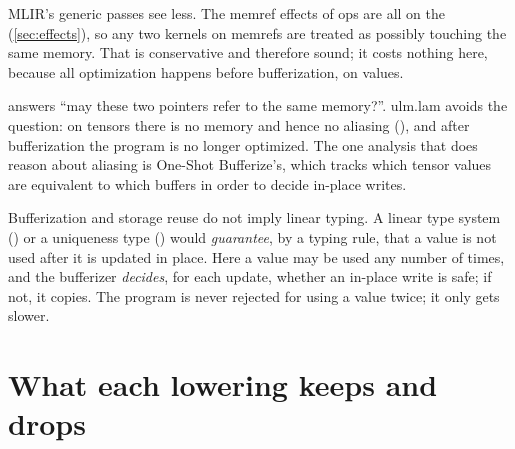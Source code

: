 MLIR's generic passes see less. The memref effects of  ops
are all on the  (\cref{sec:effects}), so any two
kernels on memrefs are treated as possibly touching the same memory. That
is conservative and therefore sound; it costs nothing here, because all
optimization happens before bufferization, on values.

\begin{theory}
answers ``may these two pointers refer to the same memory?''. ulm.lam
avoids the question: on tensors there is no memory and hence no aliasing
(), and after bufferization the program is no longer optimized. The
one analysis that does reason about aliasing is One-Shot Bufferize's, which
tracks which tensor values are equivalent to which buffers in order to
decide in-place writes.
\end{theory}

\begin{limit}
Bufferization and storage reuse do not imply linear typing. A linear type
system () or a uniqueness type () would \emph{guarantee},
by a typing rule, that a value is not used after it is updated in place.
Here a value may be used any number of times, and the bufferizer
\emph{decides}, for each update, whether an in-place write is safe; if not,
it copies. The program is never rejected for using a value twice; it only
gets slower.
\end{limit}

\section{What each lowering keeps and drops}
\label{sec:storage-lost}

